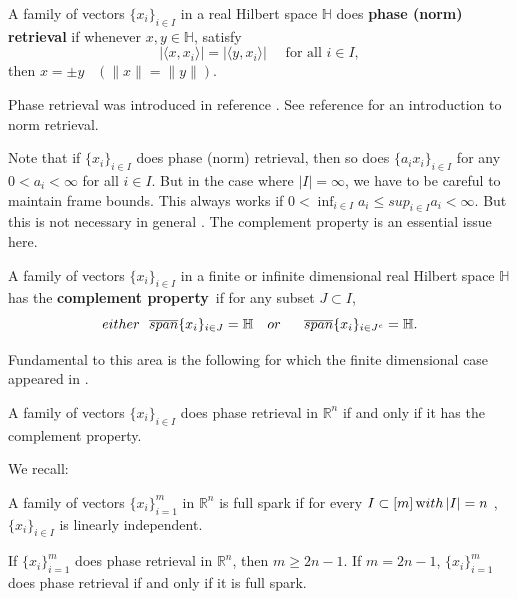 \begin{definition}\label{D:phase(norm) retrieval by vectors}
\textrm A family of vectors $\{x_{i}\}_{i\in I}$ in a real Hilbert space $\mathbb {H}$ does \textbf {phase (norm) retrieval} if whenever $ x, y \in \mathbb {H}$, satisfy
$$|\langle x,x_{i}\rangle |=|\langle y,x_{i}\rangle| \quad \mbox{ for all } i\in I,$$
then $x=\pm y$ \, $(\|x\|=\|y\|). $
\end{definition}
Phase retrieval was introduced in reference \cite{BCE2006}. See reference \cite{ACHR2021} for an introduction to norm retrieval.

Note that if $\{x_i\}_{i\in I}$ does phase (norm) retrieval, then so does $\{a_ix_i\}_{i\in I}$ for any $0< a_i< \infty$ for all $i\in I$.
But in the case where $|I|=\infty$, we have to be careful to maintain frame bounds. This always works if $0<\inf_{i\in I}a_i \le sup_{i\in I}a_i < \infty$.
But this is not necessary in general \cite{ACHR2021}.
 The complement property is an essential issue here.

\begin{definition}\label{D:complement pro in infinite case}
\textrm A family of vectors $\{x_{i}\}_{i\in I}$ in a finite or infinite dimensional real Hilbert space $\mathbb{H}$ has the \textbf{complement property}\, \textrm  if for any subset $J\subset I$, \\
$$either\ \  \overline{span}\{x_{i}\}_{i\in J}=\mathbb{H} \textrm \quad or \quad \ \  \overline{span}\{x_{i}\}_{i\in J^c}=\mathbb{H}. $$
\end{definition}
Fundamental to this area is the following for which the finite dimensional case appeared in \cite{CCPW13}.
\begin{theorem}\label{T:p34}
A family of vectors $\{x_{i}\}_{i\in I} $ does phase retrieval in $\mathbb{R}^n$ if and only if it has the complement property.
\end{theorem}

We recall:

\begin{definition}\label{D:full spark}
\textrm A family of vectors $\{x_{i}\}_{i=1}^{m}$ \textrm in $\mathbb{R}^n$ is full spark if for every $I \subset [m] \, \mbox with \, |I|=n$ \textrm, $\{x_{i}\}_{i \in I}$ \textrm
is linearly independent.\end{definition}
\begin{corollary}\label{T:xx11}
\textrm If $\{x_{i}\}_{i=1}^{m} $  \textrm does phase retrieval in $\mathbb {R}^n$, then $m \geq2n-1$. If $m=2n-1$, $\{x_{i}\}_{i=1}^{m} $ does phase retrieval if and only if it is full spark.
\end{corollary}

